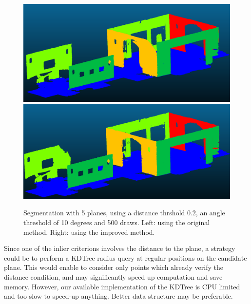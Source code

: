 \documentclass[a4paper]{article}
\begin{document}
\begin{figure}[ht]
    \centering
    \includegraphics[width=0.3\linewidth]{figures/Q4.png}
    \includegraphics[width=0.3\linewidth]{figures/bonus_2.png}
    \caption{Segmentation with 5 planes, using a distance thrshold 0.2, an angle threshold of 10 degrees and 500 draws.
    Left: using the original method. Right: using the improved method.}
    \label{fig:bonus_2}
\end{figure}

Since one of the inlier criterions involves the distance to the plane, a strategy could be to perform a KDTree radius query at regular positions on the candidate plane. This would enable to consider only points which already verify
the distance condition, and may significantly speed up computation and save memory. However, our available implementation of the KDTree is CPU limited and too slow to speed-up anything. Better data structure may be preferable.
\end{document}
